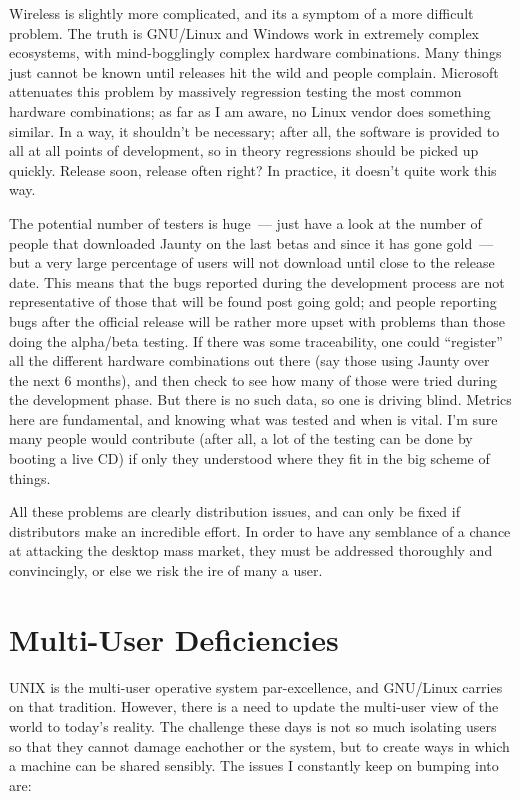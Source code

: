 \documentclass{memoir}
\begin{document}
Wireless is slightly more complicated, and its a symptom of a more
difficult problem. The truth is GNU/Linux and Windows work in
extremely complex ecosystems, with mind-bogglingly complex hardware
combinations. Many things just cannot be known until releases hit the
wild and people complain. Microsoft attenuates this problem by
massively regression testing the most common hardware combinations; as
far as I am aware, no Linux vendor does something similar. In a way,
it shouldn't be necessary; after all, the software is provided to all
at all points of development, so in theory regressions should be
picked up quickly. Release soon, release often right? In practice, it
doesn't quite work this way.

The potential number of testers is huge~--- just have a look at the
number of people that downloaded Jaunty on the last betas and since it
has gone gold~--- but a very large percentage of users will not
download until close to the release date. This means that the bugs
reported during the development process are not representative of
those that will be found post going gold; and people reporting bugs
after the official release will be rather more upset with problems
than those doing the alpha/beta testing. If there was some
traceability, one could ``register'' all the different hardware
combinations out there (say those using Jaunty over the next 6
months), and then check to see how many of those were tried during the
development phase. But there is no such data, so one is driving
blind. Metrics here are fundamental, and knowing what was tested and
when is vital. I'm sure many people would contribute (after all, a lot
of the testing can be done by booting a live CD) if only they
understood where they fit in the big scheme of things.

All these problems are clearly distribution issues, and can only be
fixed if distributors make an incredible effort. In order to have any
semblance of a chance at attacking the desktop mass market, they must
be addressed thoroughly and convincingly, or else we risk the ire of
many a user.

\section{Multi-User Deficiencies}

UNIX is the multi-user operative system par-excellence, and GNU/Linux
carries on that tradition. However, there is a need to update the
multi-user view of the world to today's reality. The challenge these
days is not so much isolating users so that they cannot damage
eachother or the system, but to create ways in which a machine can be
shared sensibly. The issues I constantly keep on bumping into are:
\end{document}
